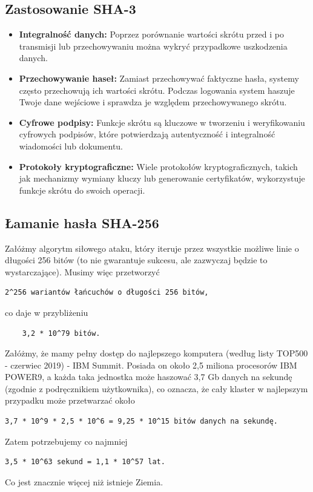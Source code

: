 \documentclass[12pt, a4paper]{article}
\begin{document}
\subsection{Zastosowanie SHA-3}
\begin{itemize}
\item \textbf{Integralność danych:} Poprzez porównanie wartości skrótu przed i po transmisji lub przechowywaniu można wykryć przypadkowe uszkodzenia danych.
\item \textbf{Przechowywanie haseł:} Zamiast przechowywać faktyczne hasła, systemy często przechowują ich wartości skrótu. Podczas logowania system haszuje Twoje dane wejściowe i sprawdza je względem przechowywanego skrótu.
\item \textbf{Cyfrowe podpisy:} Funkcje skrótu są kluczowe w tworzeniu i weryfikowaniu cyfrowych podpisów, które potwierdzają autentyczność i integralność wiadomości lub dokumentu.
\item \textbf{Protokoły kryptograficzne:} Wiele protokołów kryptograficznych, takich jak mechanizmy wymiany kluczy lub generowanie certyfikatów, wykorzystuje funkcje skrótu do swoich operacji.
\end{itemize}
\subsection{Łamanie hasła SHA-256}
Załóżmy algorytm siłowego ataku, który iteruje przez wszystkie możliwe linie o długości 256 bitów (to nie gwarantuje sukcesu, ale zazwyczaj będzie to wystarczające). Musimy więc przetworzyć 
\begin{verbatim}
2^256 wariantów łańcuchów o długości 256 bitów, 
\end{verbatim}
co daje w przybliżeniu
\begin{verbatim}
    3,2 * 10^79 bitów.
\end{verbatim}
    Załóżmy, że mamy pełny dostęp do najlepszego komputera (według listy TOP500 - czerwiec 2019) - IBM Summit. Posiada on około 2,5 miliona procesorów IBM POWER9, a każda taka jednostka może haszować 3,7 Gb danych na sekundę (zgodnie z podręcznikiem użytkownika), co oznacza, że cały klaster w najlepszym przypadku może przetwarzać około 
\begin{verbatim} 
3,7 * 10^9 * 2,5 * 10^6 = 9,25 * 10^15 bitów danych na sekundę.
\end{verbatim}
Zatem potrzebujemy co najmniej 
\begin{verbatim}
3,5 * 10^63 sekund = 1,1 * 10^57 lat. 
\end{verbatim}
Co jest znacznie więcej niż istnieje Ziemia. 
\end{document}

